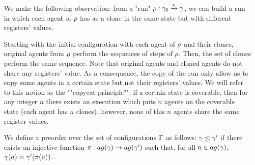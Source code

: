\begin{remark}
	\label{rem:copycat-principle}
	We make the following observation: from a "run" $\rho : \gamma_0 \xrightarrow{\ast} \gamma$, we can build a run in which each agent of $\rho$ has as a clone in the same state but with different registers' values. 
	
	Starting with the initial configuration with each agent of $\rho$ and their clones, original agents from $\rho$ perform the sequences of steps of $\rho$. Then, the set of clones perform the same sequence. 
	Note that original agents and cloned agents do not share any registers' value. As a consequence, the copy of the run only allow us to copy some agents in a certain state but not their registers' values. We will refer to this notion as the ""copycat principle"": if a certain state is coverable, then for any integer $n$ there exists an execution which puts $n$ agents on the coverable state (each agent has $n$ clones), however, none of this $n$ agents share the same register values.
	
	
	
	
\end{remark}

	
	\begin{definition}
		We define a preorder over the set of configurations $\Gamma$ as follows: $\gamma \trianglelefteq \gamma'$ if there exists an injective function $\pi: \agentsof{\config} \rightarrow \agentsof{\config'}$ such that, for all $a \in \agentsof{\config}$, $\gamma(a) = \gamma'(\pi(a))$. 
	\end{definition}
	
